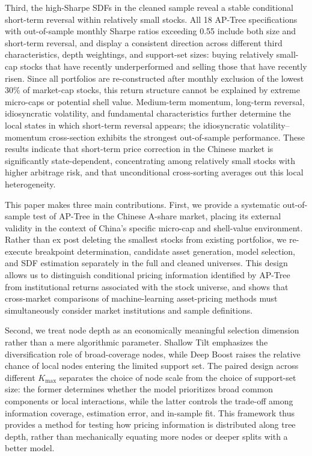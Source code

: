 \documentclass[12pt]{article}
\begin{document}
Third, the high-Sharpe SDFs in the cleaned sample reveal a stable conditional short-term reversal within relatively small stocks. All 18 AP-Tree specifications with out-of-sample monthly Sharpe ratios exceeding 0.55 include both size and short-term reversal, and display a consistent direction across different third characteristics, depth weightings, and support-set sizes: buying relatively small-cap stocks that have recently underperformed and selling those that have recently risen. Since all portfolios are re-constructed after monthly exclusion of the lowest \(30\%\) of market-cap stocks, this return structure cannot be explained by extreme micro-caps or potential shell value. Medium-term momentum, long-term reversal, idiosyncratic volatility, and fundamental characteristics further determine the local states in which short-term reversal appears; the idiosyncratic volatility–momentum cross-section exhibits the strongest out-of-sample performance. These results indicate that short-term price correction in the Chinese market is significantly state-dependent, concentrating among relatively small stocks with higher arbitrage risk, and that unconditional cross-sorting averages out this local heterogeneity.

This paper makes three main contributions. First, we provide a systematic out-of-sample test of AP-Tree in the Chinese A-share market, placing its external validity in the context of China's specific micro-cap and shell-value environment. Rather than ex post deleting the smallest stocks from existing portfolios, we re-execute breakpoint determination, candidate asset generation, model selection, and SDF estimation separately in the full and cleaned universes. This design allows us to distinguish conditional pricing information identified by AP-Tree from institutional returns associated with the stock universe, and shows that cross-market comparisons of machine-learning asset-pricing methods must simultaneously consider market institutions and sample definitions.

Second, we treat node depth as an economically meaningful selection dimension rather than a mere algorithmic parameter. Shallow Tilt emphasizes the diversification role of broad-coverage nodes, while Deep Boost raises the relative chance of local nodes entering the limited support set. The paired design across different \(K_{\max}\) separates the choice of node scale from the choice of support-set size: the former determines whether the model prioritizes broad common components or local interactions, while the latter controls the trade-off among information coverage, estimation error, and in-sample fit. This framework thus provides a method for testing how pricing information is distributed along tree depth, rather than mechanically equating more nodes or deeper splits with a better model.
\end{document}
